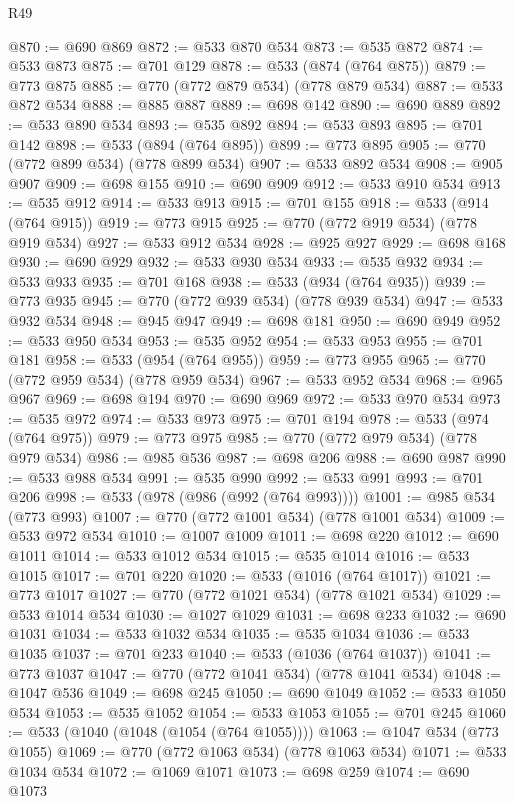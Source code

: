 \begin{lexlean}{R49}
\begin{coremodule}
@870 := @690 @869
@872 := @533 @870 @534
@873 := @535 @872
@874 := @533 @873
@875 := @701 @129
@878 := @533 (@874 (@764 @875))
@879 := @773 @875
@885 := @770 (@772 @879 @534) (@778 @879 @534)
@887 := @533 @872 @534
@888 := @885 @887
@889 := @698 @142
@890 := @690 @889
@892 := @533 @890 @534
@893 := @535 @892
@894 := @533 @893
@895 := @701 @142
@898 := @533 (@894 (@764 @895))
@899 := @773 @895
@905 := @770 (@772 @899 @534) (@778 @899 @534)
@907 := @533 @892 @534
@908 := @905 @907
@909 := @698 @155
@910 := @690 @909
@912 := @533 @910 @534
@913 := @535 @912
@914 := @533 @913
@915 := @701 @155
@918 := @533 (@914 (@764 @915))
@919 := @773 @915
@925 := @770 (@772 @919 @534) (@778 @919 @534)
@927 := @533 @912 @534
@928 := @925 @927
@929 := @698 @168
@930 := @690 @929
@932 := @533 @930 @534
@933 := @535 @932
@934 := @533 @933
@935 := @701 @168
@938 := @533 (@934 (@764 @935))
@939 := @773 @935
@945 := @770 (@772 @939 @534) (@778 @939 @534)
@947 := @533 @932 @534
@948 := @945 @947
@949 := @698 @181
@950 := @690 @949
@952 := @533 @950 @534
@953 := @535 @952
@954 := @533 @953
@955 := @701 @181
@958 := @533 (@954 (@764 @955))
@959 := @773 @955
@965 := @770 (@772 @959 @534) (@778 @959 @534)
@967 := @533 @952 @534
@968 := @965 @967
@969 := @698 @194
@970 := @690 @969
@972 := @533 @970 @534
@973 := @535 @972
@974 := @533 @973
@975 := @701 @194
@978 := @533 (@974 (@764 @975))
@979 := @773 @975
@985 := @770 (@772 @979 @534) (@778 @979 @534)
@986 := @985 @536
@987 := @698 @206
@988 := @690 @987
@990 := @533 @988 @534
@991 := @535 @990
@992 := @533 @991
@993 := @701 @206
@998 := @533 (@978 (@986 (@992 (@764 @993))))
@1001 := @985 @534 (@773 @993)
@1007 := @770 (@772 @1001 @534) (@778 @1001 @534)
@1009 := @533 @972 @534
@1010 := @1007 @1009
@1011 := @698 @220
@1012 := @690 @1011
@1014 := @533 @1012 @534
@1015 := @535 @1014
@1016 := @533 @1015
@1017 := @701 @220
@1020 := @533 (@1016 (@764 @1017))
@1021 := @773 @1017
@1027 := @770 (@772 @1021 @534) (@778 @1021 @534)
@1029 := @533 @1014 @534
@1030 := @1027 @1029
@1031 := @698 @233
@1032 := @690 @1031
@1034 := @533 @1032 @534
@1035 := @535 @1034
@1036 := @533 @1035
@1037 := @701 @233
@1040 := @533 (@1036 (@764 @1037))
@1041 := @773 @1037
@1047 := @770 (@772 @1041 @534) (@778 @1041 @534)
@1048 := @1047 @536
@1049 := @698 @245
@1050 := @690 @1049
@1052 := @533 @1050 @534
@1053 := @535 @1052
@1054 := @533 @1053
@1055 := @701 @245
@1060 := @533 (@1040 (@1048 (@1054 (@764 @1055))))
@1063 := @1047 @534 (@773 @1055)
@1069 := @770 (@772 @1063 @534) (@778 @1063 @534)
@1071 := @533 @1034 @534
@1072 := @1069 @1071
@1073 := @698 @259
@1074 := @690 @1073

\end{coremodule}
\end{lexlean}
